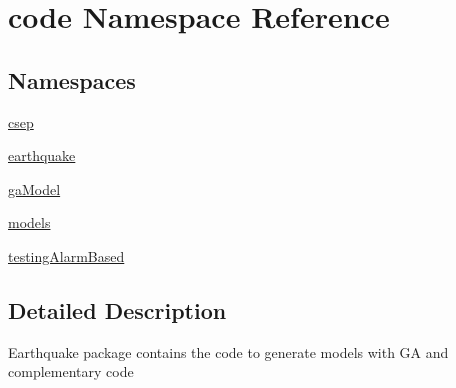 \hypertarget{namespacecode}{}\section{code Namespace Reference}
\label{namespacecode}
\subsection*{Namespaces}
\begin{DoxyCompactItemize}
\item 
 \hyperlink{namespacecode_1_1csep}{csep}
\item 
 \hyperlink{namespacecode_1_1earthquake}{earthquake}
\item 
 \hyperlink{namespacecode_1_1ga_model}{ga\+Model}
\item 
 \hyperlink{namespacecode_1_1models}{models}
\item 
 \hyperlink{namespacecode_1_1testing_alarm_based}{testing\+Alarm\+Based}
\end{DoxyCompactItemize}


\subsection{Detailed Description}
\begin{DoxyVerb}Earthquake package contains the code to generate models with GA and complementary code
\end{DoxyVerb}
 